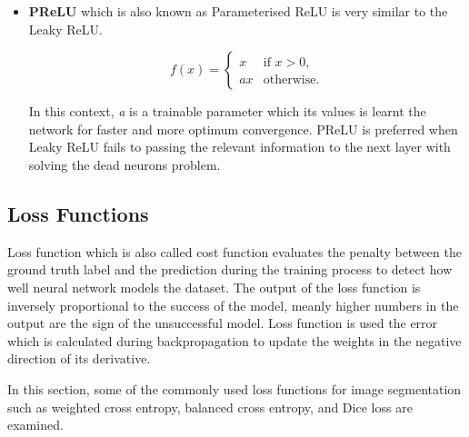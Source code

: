 \begin{itemize}
            \item \textbf{PReLU} which is also known as Parameterised ReLU is very similar to the Leaky ReLU.

                    \begin{equation}
                         f(x) = \begin{cases}
                            x & \text{if } x > 0, \\
                            a x & \text{otherwise}.
                        \end{cases}
                    \end{equation}

                    In this context, \emph{a} is a trainable parameter which its values is learnt the network for faster and more optimum convergence.
                    PReLU is preferred when Leaky ReLU fails to passing the relevant information to the next layer with solving the dead neurons problem.

        \end{itemize}

    \subsection{Loss Functions}

        Loss function which is also called cost function evaluates the penalty between the ground truth label and the prediction during the training process to detect how well neural network models the dataset.
        The output of the loss function is inversely proportional to the success of the model, meanly higher numbers in the output are the sign of the unsuccessful model.
        Loss function is used the error which is calculated during backpropagation to update the weights in the negative direction of its derivative.

        In this section, some of the commonly used loss functions for image segmentation such as weighted cross entropy, balanced cross entropy, and Dice loss are examined.

